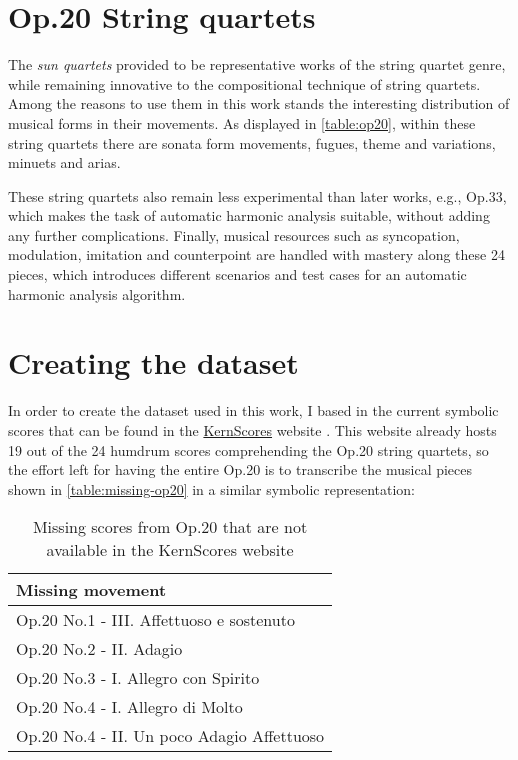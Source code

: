 \section{Op.20 String quartets}
The \emph{sun quartets} provided to be representative works of the string quartet genre, while remaining innovative to the compositional technique of string quartets. Among the reasons to use them in this work stands the interesting distribution of musical forms in their movements. As displayed in \autoref{table:op20}, within these string quartets there are sonata form movements, fugues, theme and variations, minuets and arias.

These string quartets also remain less experimental than later works, e.g., Op.33, which makes the task of automatic harmonic analysis suitable, without adding any further complications. Finally, musical resources such as syncopation, modulation, imitation and counterpoint are handled with mastery along these 24 pieces, which introduces different scenarios and test cases for an automatic harmonic analysis algorithm.

\section{Creating the dataset}
In order to create the dataset used in this work, I based in the current symbolic scores that can be found in the \href{http://kern.ccarh.org/}{KernScores} website \cite{kernscores}. This website already hosts 19 out of the 24 humdrum scores comprehending the Op.20 string quartets, so the effort left for having the entire Op.20 is to transcribe the musical pieces shown in \autoref{table:missing-op20} in a similar symbolic representation:

\begin{table}[]
\centering
\begin{tabular}{|l|}
\hline
Missing movement \\ \hline
Op.20 No.1 - III. Affettuoso e sostenuto \\ \hline
Op.20 No.2 - II. Adagio \\ \hline
Op.20 No.3 - I. Allegro con Spirito \\ \hline
Op.20 No.4 - I. Allegro di Molto \\ \hline
Op.20 No.4 - II. Un poco Adagio Affettuoso \\ \hline
\end{tabular}
\caption{Missing scores from Op.20 that are not available in the KernScores website}
\label{table:missing-op20}
\end{table}

\newpage
